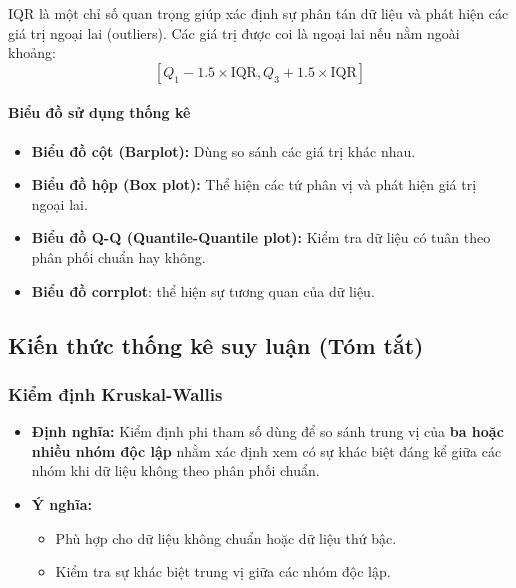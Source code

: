 IQR là một chỉ số quan trọng giúp xác định sự phân tán dữ liệu và phát hiện các giá trị ngoại lai (outliers). Các giá trị được coi là ngoại lai nếu nằm ngoài khoảng:
\[
[Q_1 - 1.5 \times \text{IQR}, Q_3 + 1.5 \times \text{IQR}]
\]

\paragraph{Biểu đồ sử dụng thống kê}
\begin{itemize}
    \item \textbf{Biểu đồ cột (Barplot):} Dùng so sánh các giá trị khác nhau.
    \item \textbf{Biểu đồ hộp (Box plot):} Thể hiện các tứ phân vị và phát hiện giá trị ngoại lai.
    \item \textbf{Biểu đồ Q-Q (Quantile-Quantile plot):} Kiểm tra dữ liệu có tuân theo phân phối chuẩn hay không.
    \item \textbf{Biểu đồ corrplot}: thể hiện sự tương quan của dữ liệu. 
\end{itemize}

\subsection{Kiến thức thống kê suy luận (Tóm tắt)}

\subsubsection{Kiểm định Kruskal-Wallis}  
\begin{itemize}
    \item \textbf{Định nghĩa:} Kiểm định phi tham số dùng để so sánh trung vị của \textbf{ba hoặc nhiều nhóm độc lập} nhằm xác định xem có sự khác biệt đáng kể giữa các nhóm khi dữ liệu không theo phân phối chuẩn.  
    \item \textbf{Ý nghĩa:}  
    \begin{itemize}
        \item Phù hợp cho dữ liệu không chuẩn hoặc dữ liệu thứ bậc.  
        \item Kiểm tra sự khác biệt trung vị giữa các nhóm độc lập.  
    \end{itemize}
\end{itemize}

